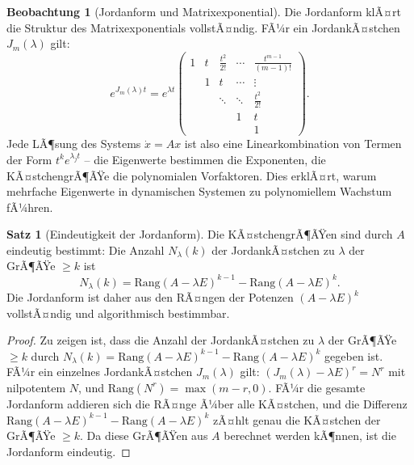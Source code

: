﻿\documentclass[a4paper,12pt]{report}
\theoremstyle{definition}
\newtheorem{satz}{Satz}
\newtheorem{beobachtung}{Beobachtung}
\begin{document}
\begin{beobachtung}[Jordanform und Matrixexponential]
    Die Jordanform klÃ¤rt die Struktur des Matrixexponentials vollstÃ¤ndig.
    FÃ¼r ein JordankÃ¤stchen $J_m(\lambda)$ gilt:
    \[
        e^{J_m(\lambda)t} = e^{\lambda t}
        \begin{pmatrix}
            1 & t & \frac{t^2}{2!} & \cdots & \frac{t^{m-1}}{(m-1)!} \\
              & 1 & t & \cdots & \vdots \\
              & & \ddots & \ddots & \frac{t^2}{2!} \\
              & & & 1 & t \\
              & & & & 1
        \end{pmatrix}.
    \]
    Jede LÃ¶sung des Systems $\dot{x} = Ax$ ist also eine Linearkombination
    von Termen der Form $t^k e^{\lambda_j t}$ -- die Eigenwerte bestimmen
    die Exponenten, die KÃ¤stchengrÃ¶ÃŸe die polynomialen Vorfaktoren.
    Dies erklÃ¤rt, warum mehrfache Eigenwerte in dynamischen Systemen
    zu polynomiellem Wachstum fÃ¼hren.
\end{beobachtung}

\begin{satz}[Eindeutigkeit der Jordanform]
    Die KÃ¤stchengrÃ¶ÃŸen sind durch $A$ eindeutig bestimmt: Die Anzahl
    $N_\lambda(k)$ der JordankÃ¤stchen zu $\lambda$ der GrÃ¶ÃŸe $\geq k$ ist
    \[
        N_\lambda(k) = \mathrm{Rang}(A - \lambda E)^{k-1} -
        \mathrm{Rang}(A - \lambda E)^k.
    \]
    Die Jordanform ist daher aus den RÃ¤ngen der Potenzen $(A - \lambda E)^k$
    vollstÃ¤ndig und algorithmisch bestimmbar.
\end{satz}
\begin{proof}
    Zu zeigen ist, dass die Anzahl der JordankÃ¤stchen zu $\lambda$ der GrÃ¶ÃŸe $\geq k$
    durch $N_\lambda(k) = \mathrm{Rang}(A - \lambda E)^{k-1} - \mathrm{Rang}(A - \lambda E)^k$
    gegeben ist. FÃ¼r ein einzelnes JordankÃ¤stchen $J_m(\lambda)$ gilt:
    $(J_m(\lambda) - \lambda E)^r = N^r$ mit nilpotentem $N$, und
    $\mathrm{Rang}(N^r) = \max(m - r, 0)$. FÃ¼r die gesamte Jordanform addieren sich
    die RÃ¤nge Ã¼ber alle KÃ¤stchen, und die Differenz $\mathrm{Rang}(A-\lambda E)^{k-1}
    - \mathrm{Rang}(A-\lambda E)^k$ zÃ¤hlt genau die KÃ¤stchen der GrÃ¶ÃŸe $\geq k$.
    Da diese GrÃ¶ÃŸen aus $A$ berechnet werden kÃ¶nnen, ist die Jordanform eindeutig.
\end{proof}


\end{document}
